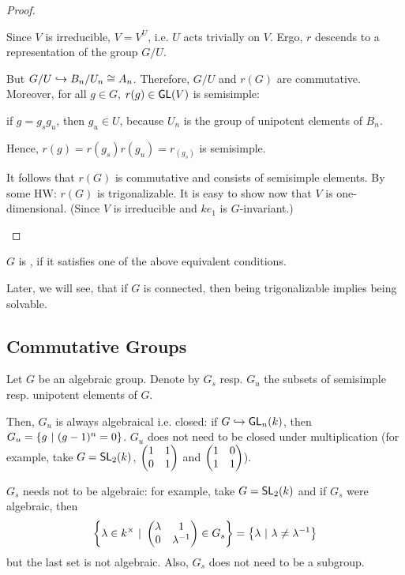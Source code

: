 \begin{proof}
\begin{enumerate}
Since $V$ is irreducible, $V = V^U$, i.e. $U$ acts trivially on $V$. Ergo, $r$ descends to a representation of the group $G/U$.

But $G/U \overset{}{\hookrightarrow} B_n / U_n \overset{}{\cong} A_n$. Therefore, $G/U$ and $r(G)$ are commutative. Moreover, for all $g \in G$, $r(g) \in \textsf{GL}(V)$ is semisimple:

if $g = g_sg_u$, then $g_u \in U$, because $U_n$ is the group of unipotent elements of $B_n$.

Hence, $r(g) = r(g_s) r(g_u) = r_(g_s)$ is semisimple.

It follows that $r(G)$ is commutative and consists of semisimple elements. By some HW: $r(G)$ is trigonalizable. It is easy to show now that $V$ is one-dimensional. (Since $V$ is irreducible and $ke_1$ is $G$-invariant.)
\end{enumerate}
\end{proof}
\begin{definition}
	$G$ is , if it satisfies one of the above equivalent conditions.
\end{definition}
	Later, we will see, that if $G$ is connected, then being trigonalizable implies being solvable.
	
	
\subsection{Commutative Groups}
Let $G$ be an algebraic group. Denote by $G_s$ resp. $G_u$ the subsets of semisimple resp. unipotent elements of $G$.

Then, $G_u$ is always algebraical i.e. closed: if $G \overset{}{\hookrightarrow} \textsf{GL}_n(k)$, then $G_u = \left\lbrace g ~ | ~ (g-1)^n = 0\right\rbrace$.
$G_u$ does not need to be closed under multiplication (for example, take $G = \textsf{SL}_2(k)$, $\left(\begin{matrix} 1 & 1 \\ 0 & 1 \end{matrix}\right)$ and $\left(\begin{matrix} 1 & 0\\ 1 & 1 \end{matrix}\right)$).

$G_s$ needs not to be algebraic: for example, take $G = \textsf{SL}_2(k)$ and if $G_s$ were algebraic, then
\[ \left\lbrace\lambda \in k^\times ~ | ~ 
\left(\begin{matrix} \lambda & 1\\ 0 & \lambda^{-1} \end{matrix}\right) \in G_s
\right\rbrace = \left\lbrace \lambda ~ | ~ \lambda \neq \lambda^{-1}\right\rbrace \]
but the last set is not algebraic. Also, $G_s$ does not need to be a subgroup.